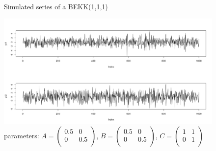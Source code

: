 \documentclass[11pt]{article}
\begin{document}
\begin{figure}[hc]
\centering
\caption{Simulated series of a BEKK(1,1,1)}
\caption*{parameters: $A = \begin{pmatrix} 
0.5 & 0 \\
0 & 0.5 \\
\end{pmatrix}$, $B = \begin{pmatrix} 
0.5 & 0 \\
0 & 0.5 \\
\end{pmatrix}$, $C = \begin{pmatrix} 
1 & 1 \\
0 & 1 \\
\end{pmatrix}$}
\label{correlogram1}
\includegraphics[width=160mm]{graphs/problem2_simulated_series.png}
\end{figure}
\clearpage
\end{document}
